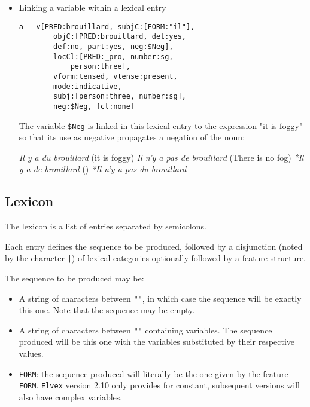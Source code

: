 \documentclass[11pt]{article}
\begin{document}
\begin{itemize}
\item Linking a variable within a lexical entry

\begin{lstlisting}[numbers=none]
a	v[PRED:brouillard, subjC:[FORM:"il"], 
		objC:[PRED:brouillard, det:yes, 
		def:no, part:yes, neg:$Neg], 
		locCl:[PRED:_pro, number:sg, 
			person:three], 
		vform:tensed, vtense:present, 
		mode:indicative, 
		subj:[person:three, number:sg], 
		neg:$Neg, fct:none]
\end{lstlisting}

The variable \verb#$Neg# is linked in this lexical entry to the expression "it is foggy" so that its use as negative propagates a negation of the noun:

\begin{exe}
\ex \begin{xlist} 
\ex \label{0-a} \textit{Il y a du brouillard} (it is foggy)
\ex \label{0-a} \textit{Il n'y a pas de brouillard} (There is no fog)
\ex \label{0-a} \textit{*Il y a de brouillard} ()
\ex \label{0-a} \textit{*Il n'y a pas du brouillard}
\end{xlist}
\end{exe}

\end{itemize}

\subsection{Lexicon}

The lexicon is a list of entries separated by semicolons.

Each entry defines the sequence to be produced, followed by a disjunction
(noted by the character \verb#|#) of lexical categories
optionally followed by a feature structure.

The sequence to be produced may be:

\begin{itemize}
\item A string of characters between \verb#""#, in which case the sequence
  will be exactly this one. Note that the sequence may be empty.

\item A string of characters between \verb#""# containing
  variables. The sequence produced will be this one with the variables
  substituted by their respective values.

\item \texttt{FORM}: the sequence produced will literally be the one
  given by the feature \texttt{FORM}. \texttt{Elvex} version 2.10 only provides for
  constant, subsequent versions will also have
  complex variables.

\end{itemize}
\end{document}
